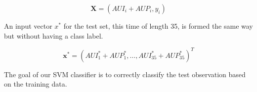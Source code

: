 \begin{equation}
	\mathbf{X} = (AUI_i + AUP_i, y_i)
\end{equation}

An input vector $x^*$ for the test set, this time of length 35, is formed the same way but without having a class label.

\begin{equation}
	\mathbf{x^*} = (AUI^*_1 + AUP^*_1, \dots, AUI^*_{35} + AUP^*_{35})^T
\end{equation}

The goal of our SVM classifier is to correctly classify the test observation based on the training data.





